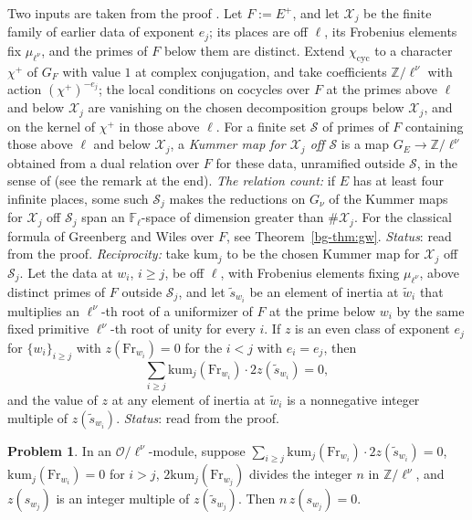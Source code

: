 \documentclass[reqno]{amsart}
\theoremstyle{definition}
\newtheorem{problem}{Problem}[section]
\theoremstyle{plain}
\newcommand{\Z}{\mathbb{Z}}
\newcommand{\Oc}{\mathcal{O}}
\newcommand{\cyc}{\chi_{\mathrm{cyc}}}
\newcommand{\Fr}{\mathrm{Fr}}
\begin{document}
Two inputs are taken from the proof \cite{GL}.  Let \(F := E^+\), and let \(\mathcal X_j\) be the finite family of earlier data of exponent \(e_j\); its places are off \(\ell\), its Frobenius elements fix \(\mu_{\ell^\nu}\), and the primes of \(F\) below them are distinct.  Extend \(\cyc\) to a character \(\chi^+\) of \(G_F\) with value \(1\) at complex conjugation, and take coefficients \(\Z/\ell^\nu\) with action \((\chi^+)^{-e_j}\); the local conditions on cocycles over \(F\) at the primes above \(\ell\) and below \(\mathcal X_j\) are vanishing on the chosen decomposition groups below \(\mathcal X_j\), and on the kernel of \(\chi^+\) in those above \(\ell\).  For a finite set \(\mathcal S\) of primes of \(F\) containing those above \(\ell\) and below \(\mathcal X_j\), a \emph{Kummer map for \(\mathcal X_j\) off \(\mathcal S\)} is a map \(G_E \to \Z/\ell^\nu\) obtained from a dual relation over \(F\) for these data, unramified outside \(\mathcal S\), in the sense of \cite{GL} (see the remark at the end).  \emph{The relation count:} if \(E\) has at least four infinite places, some such \(\mathcal S_j\) makes the reductions on \(G_\nu\) of the Kummer maps for \(\mathcal X_j\) off \(\mathcal S_j\) span an \(\mathbb F_\ell\)-space of dimension greater than \(\#\mathcal X_j\).  For the classical formula of Greenberg and Wiles over \(F\), see Theorem~\ref{bg-thm:gw}.  \emph{Status}: read from the proof.  \emph{Reciprocity:} take \(\mathrm{kum}_j\) to be the chosen Kummer map for \(\mathcal X_j\) off \(\mathcal S_j\).  Let the data at \(w_i\), \(i \ge j\), be off \(\ell\), with Frobenius elements fixing \(\mu_{\ell^\nu}\), above distinct primes of \(F\) outside \(\mathcal S_j\), and let \(\tilde s_{w_i}\) be an element of inertia at \(\tilde w_i\) that multiplies an \(\ell^\nu\)-th root of a uniformizer of \(F\) at the prime below \(w_i\) by the same fixed primitive \(\ell^\nu\)-th root of unity for every \(i\).  If \(z\) is an even class of exponent \(e_j\) for \(\{w_i\}_{i \ge j}\) with \(z(\Fr_{w_i}) = 0\) for the \(i < j\) with \(e_i = e_j\), then
\[
  \sum_{i \ge j} \mathrm{kum}_j(\Fr_{w_i}) \cdot 2z(\tilde s_{w_i}) = 0 ,
\]
and the value of \(z\) at any element of inertia at \(\tilde w_i\) is a nonnegative integer multiple of \(z(\tilde s_{w_i})\).  \emph{Status}: read from the proof.

\begin{problem}\label{pr:triangle-step}
In an \(\Oc/\ell^\nu\)-module, suppose \(\sum_{i \ge j} \mathrm{kum}_j(\Fr_{w_i})\cdot 2z(\tilde s_{w_i}) = 0\), \(\mathrm{kum}_j(\Fr_{w_i}) = 0\) for \(i > j\), \(2\mathrm{kum}_j(\Fr_{w_j})\) divides the integer \(n\) in \(\Z/\ell^\nu\), and \(z(s_{w_j})\) is an integer multiple of \(z(\tilde s_{w_j})\).  Then \(n\,z(s_{w_j}) = 0\).
\end{problem}
\end{document}
